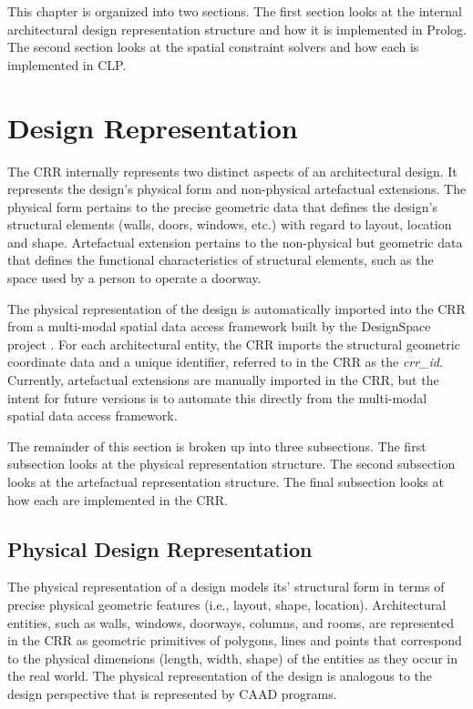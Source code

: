 \documentclass[12pt]{ucthesis}
\begin{document}
This chapter is organized into two sections. The first section looks at the internal architectural design representation structure and how it is implemented in Prolog. The second section looks at the spatial constraint solvers and how each is implemented in CLP.

\section{Design Representation}
The CRR internally represents two distinct aspects of an architectural design. It represents the design's physical form and non-physical artefactual extensions. The physical form pertains to the precise geometric data that defines the design's structural elements (walls, doors, windows, etc.) with regard to layout, location and shape. Artefactual extension pertains to the non-physical but geometric data that defines the functional characteristics of structural elements, such as the space used by a person to operate a doorway.

The physical representation of the design is automatically imported into the CRR from a multi-modal spatial data access framework \cite{MultiModal} built by the DesignSpace project \cite{DesignSpace}. For each architectural entity, the CRR imports the structural geometric coordinate data and a unique identifier, referred to in the CRR as the \emph{crr\_id}. Currently, artefactual extensions are manually imported in the CRR, but the intent for future versions is to automate this directly from the multi-modal spatial data access framework.  

The remainder of this section is broken up into three subsections. The first subsection looks at the physical representation structure. The second subsection looks at the artefactual representation structure. The final subsection looks at how each are implemented in the CRR.

\subsection{Physical Design Representation}
The physical representation of a design models its' structural form in terms of precise physical geometric features (i.e., layout, shape, location). Architectural entities, such as walls, windows, doorways, columns, and rooms, are represented in the CRR as geometric primitives of polygons, lines and points that correspond to the physical dimensions (length, width, shape) of the entities as they occur in the real world. The physical representation of the design is analogous to the design perspective that is represented by CAAD programs. 
\end{document}
